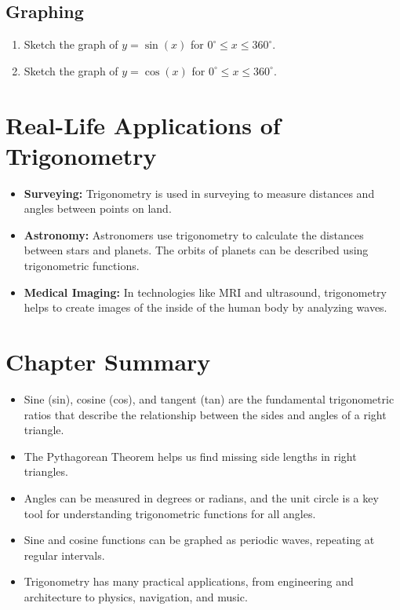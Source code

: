 \subsection{Graphing}
\begin{enumerate}
    \item Sketch the graph of $y = \sin(x)$ for $0^\circ \leq x \leq 360^\circ$.
    \item Sketch the graph of $y = \cos(x)$ for $0^\circ \leq x \leq 360^\circ$.
\end{enumerate}

\section{Real-Life Applications of Trigonometry}
\begin{itemize}
    \item \textbf{Surveying:} Trigonometry is used in surveying to measure distances and angles between points on land.
    \item \textbf{Astronomy:} Astronomers use trigonometry to calculate the distances between stars and planets. The orbits of planets can be described using trigonometric functions.
    \item \textbf{Medical Imaging:} In technologies like MRI and ultrasound, trigonometry helps to create images of the inside of the human body by analyzing waves.
\end{itemize}

\section{Chapter Summary}
\begin{itemize}
    \item Sine (sin), cosine (cos), and tangent (tan) are the fundamental trigonometric ratios that describe the relationship between the sides and angles of a right triangle.
    \item The Pythagorean Theorem helps us find missing side lengths in right triangles.
    \item Angles can be measured in degrees or radians, and the unit circle is a key tool for understanding trigonometric functions for all angles.
    \item Sine and cosine functions can be graphed as periodic waves, repeating at regular intervals.
    \item Trigonometry has many practical applications, from engineering and architecture to physics, navigation, and music.
\end{itemize}

